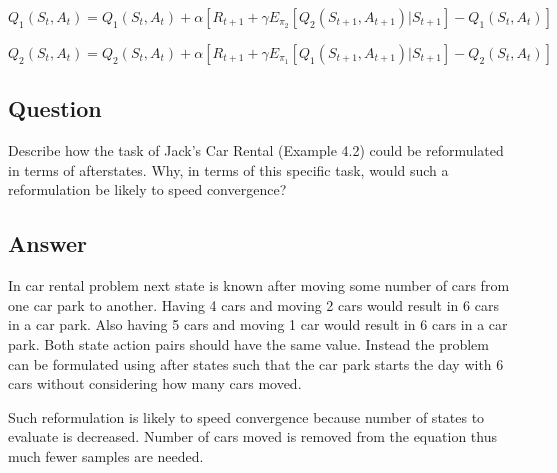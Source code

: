 \documentclass[11pt]{article}
\begin{document}
    $ Q_1(S_t, A_t) =  Q_1(S_t, A_t) + \alpha [ R_{t+1} + \gamma E_{\pi_2} [ Q_2(S_{t+1}, A_{t+1}) | S_{t+1}] - Q_1(S_t, A_t) ] $
    \newline

    $ Q_2(S_t, A_t) =  Q_2(S_t, A_t) + \alpha [ R_{t+1} + \gamma E_{\pi_1} [ Q_1(S_{t+1}, A_{t+1}) | S_{t+1}] - Q_2(S_t, A_t) ] $


    \subsection{Question}

    Describe how the task of Jack’s Car Rental (Example 4.2) could be reformulated in terms of afterstates.
    Why, in terms of this specific task, would such a  reformulation be likely to speed convergence?

    \subsection*{Answer}

    In car rental problem next state is known after moving some number of cars from one car park to another.
    Having 4 cars and moving 2 cars would result in 6 cars in a car park.
    Also having 5 cars and moving 1 car would result in 6 cars in a car park.
    Both state action pairs should have the same value.
    Instead the problem can be formulated using after states such that the car park starts the day with 6 cars without considering how many cars moved.

    Such reformulation is likely to speed convergence because number of states to evaluate is decreased.
    Number of cars moved is removed from the equation thus much fewer samples are needed.
\end{document}
